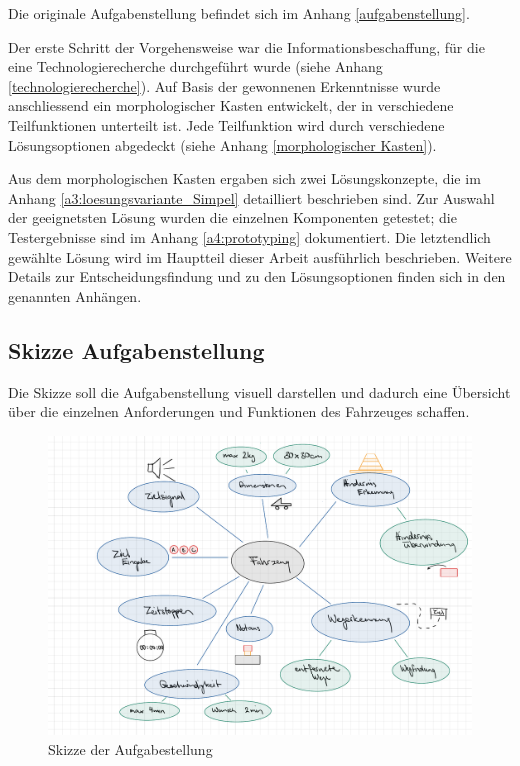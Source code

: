 \documentclass[../main.tex]{subfiles}
\begin{document}
Die originale Aufgabenstellung befindet sich im Anhang \ref{aufgabenstellung}.
\newpage

Der erste Schritt der Vorgehensweise war die Informationsbeschaffung, für die eine Technologierecherche durchgeführt wurde (siehe Anhang \ref{technologierecherche}). Auf Basis der gewonnenen Erkenntnisse wurde anschliessend ein morphologischer Kasten entwickelt, der in verschiedene Teilfunktionen unterteilt ist. Jede Teilfunktion wird durch verschiedene Lösungsoptionen abgedeckt (siehe Anhang \ref{morphologischer Kasten}).

Aus dem morphologischen Kasten ergaben sich zwei Lösungskonzepte, die im Anhang \ref{a3:loesungsvariante_Simpel} detailliert beschrieben sind. Zur Auswahl der geeignetsten Lösung wurden die einzelnen Komponenten getestet; die Testergebnisse sind im Anhang \ref{a4:prototyping} dokumentiert. Die letztendlich gewählte Lösung wird im Hauptteil dieser Arbeit ausführlich beschrieben. Weitere Details zur Entscheidungsfindung und zu den Lösungsoptionen finden sich in den genannten Anhängen.


\subsection{Skizze Aufgabenstellung}
Die Skizze soll die Aufgabenstellung visuell darstellen und dadurch eine  Übersicht über die einzelnen Anforderungen und Funktionen des Fahrzeuges schaffen.
    \begin{figure}[H]
        \includegraphics[width=\textwidth]{assets/Skizze_Aufgabenstellung.pdf}
        \caption{Skizze der Aufgabestellung}
        \label{img:Skizze_Aufgabenstellung}
    \end{figure} 
 
\end{document}
